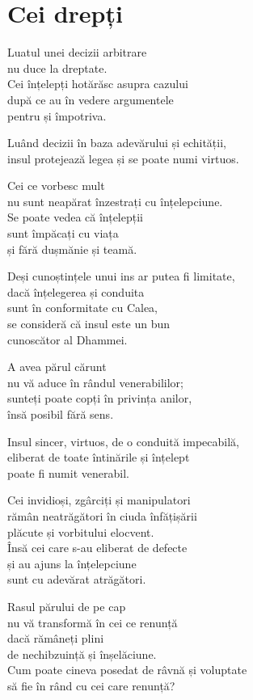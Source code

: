 
\chapter{Cei drepți}


Luatul unei decizii arbitrare\\
nu duce la dreptate.\\
Cei înțelepți hotărăsc asupra cazului\\
după ce au în vedere argumentele\\
pentru și împotriva.


Luând decizii în baza adevărului și echității,\\
insul protejează legea și se poate numi virtuos.


Cei ce vorbesc mult\\
nu sunt neapărat înzestrați cu înțelepciune.\\
Se poate vedea că înțelepții\\
sunt împăcați cu viața\\
și fără dușmănie și teamă.


Deși cunoștințele unui ins ar putea fi limitate,\\
dacă înțelegerea și conduita\\
sunt în conformitate cu Calea,\\
se consideră că insul este un bun\\
cunoscător al Dhammei.


A avea părul cărunt\\
nu vă aduce în rândul venerabililor;\\
sunteți poate copți în privința anilor,\\
însă posibil fără sens.


Insul sincer, virtuos, de o conduită impecabilă,\\
eliberat de toate întinările și înțelept\\
poate fi numit venerabil.


Cei invidioși, zgârciți și manipulatori\\
rămân neatrăgători în ciuda înfățișării\\
plăcute și vorbitului elocvent.\\
Însă cei care s-au eliberat de defecte\\
și au ajuns la înțelepciune\\
sunt cu adevărat atrăgători.


Rasul părului de pe cap\\
nu vă transformă în cei ce renunță\\
dacă rămâneți plini\\
de nechibzuință și înșelăciune.\\
Cum poate cineva posedat de râvnă și voluptate\\
să fie în rând cu cei care renunță?


